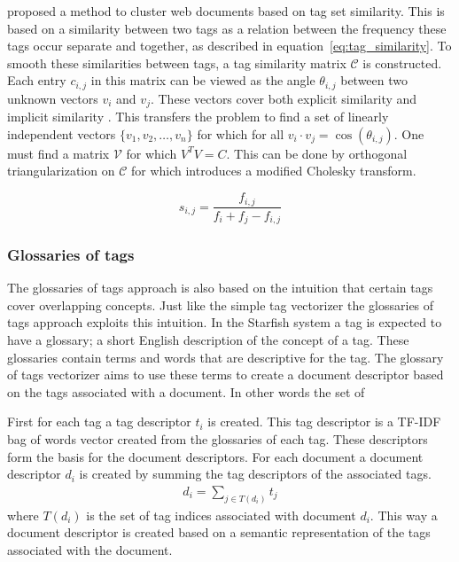\citet{zhou2011web} proposed a method to cluster web documents based on tag set
similarity. This is based on a similarity between two tags as a relation
between the frequency these tags occur separate and together, as described in
equation~\ref{eq:tag_similarity}. To smooth these similarities between tags, a
tag similarity matrix $\mathcal{C}$ is constructed. Each entry $c_{i,j}$ in
this matrix can be viewed as the angle $\theta_{i,j}$ between two unknown
vectors $v_i$ and $v_j$. These vectors cover both explicit similarity and
implicit similarity \citep{park2010vector}. This transfers the problem to find
a set of linearly independent vectors $\{v_1,v_2,\ldots,v_n\}$ for which for
all $v_i \cdot v_j = \cos(\theta_{i,j})$. One must find a matrix $\mathcal{V}$
for which $V^TV = C$. This can be done by orthogonal triangularization on
$\mathcal{C}$ for which \citeauthor{zhou2011web} introduces a modified Cholesky
transform.

\begin{equation} \label{eq:tag_similarity}
s_{i,j} = \frac{f_{i,j}}{f_i + f_j - f_{i,j}}
\end{equation}


\subsubsection{Glossaries of tags}
The glossaries of tags approach is also based on the intuition that certain
tags cover overlapping concepts. Just like the simple tag vectorizer the
glossaries of tags approach exploits this intuition. In the Starfish system a
tag is expected to have a glossary; a short English description of the concept
of a tag. These glossaries contain terms and words that are descriptive for the
tag. The glossary of tags vectorizer aims to use these terms to create a
document descriptor based on the tags associated with a document. In other
words the set of

First for each tag a tag descriptor $t_i$ is created. This tag descriptor is
a TF-IDF bag of words vector created from the glossaries of each tag. These
descriptors form the basis for the document descriptors. For each document
a document descriptor $d_i$ is created by summing the tag descriptors of the
associated tags.
\begin{align}
  d_i = \sum_{j \in T(d_i)} t_j
\end{align}
where $T(d_i)$ is the set of tag indices associated with document $d_i$. This
way a document descriptor is created based on a semantic representation of
the tags associated with the document.

